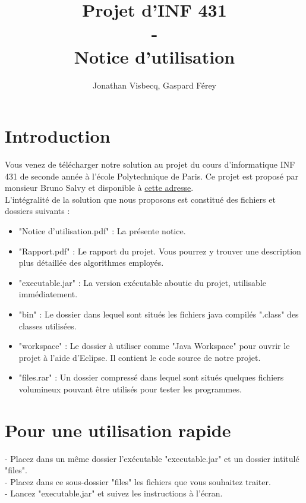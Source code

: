 \documentclass[12pt,a4paper,titlepage]{article}
\author{Jonathan Visbecq, Gaspard Férey}
\title{Projet d'INF 431 \\ - \\ Notice d'utilisation}
\begin{document}
\maketitle

\section{Introduction}
Vous venez de télécharger notre solution au projet du cours d'informatique INF 431 de seconde année à l'école Polytechnique de Paris. Ce projet est proposé par monsieur Bruno Salvy et disponible à \href{http://perso.ens-lyon.fr/bruno.salvy/INF431/Projet/INF431_-_Projet_Informatique.html}{cette adresse}.\\
L'intégralité de la solution que nous proposons est constitué des fichiers et dossiers suivants :
\begin{itemize}
\item "Notice d'utilisation.pdf" : La présente notice.
\item "Rapport.pdf" : Le rapport du projet. Vous pourrez y trouver une description plus détaillée des algorithmes employés. 
\item "executable.jar" : La version exécutable aboutie du projet, utilisable immédiatement.
\item "bin" : Le dossier dans lequel sont situés les fichiers java compilés ".class" des classes utilisées.
\item "workspace" : Le dossier à utiliser comme "Java Workspace" pour ouvrir le projet à l'aide d'Eclipse. Il contient le code source de notre projet.
\item "files.rar" : Un dossier compressé dans lequel sont situés quelques fichiers volumineux pouvant être utilisés pour tester les programmes.
\end{itemize}


\section{Pour une utilisation rapide}
- Placez dans un même dossier l'exécutable "executable.jar" et un dossier intitulé "files".\\
- Placez dans ce sous-dossier "files" les fichiers que vous souhaitez traiter. \\
- Lancez "executable.jar" et suivez les instructions à l'écran.
\end{document}
